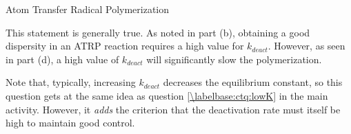 \begin{activity}{Atom Transfer Radical Polymerization}
\begin{exercises}
\begin{enumerate}
		\begin{solution}{}
			This statement is generally true.  As noted in part (b), obtaining a good dispersity in an ATRP reaction requires a high value for $k_{deact}$.  However, as seen in part (d), a high value of $k_{deact}$ will significantly slow the polymerization.
			
			Note that, typically, increasing $k_{deact}$ decreases the equilibrium constant, so this question gets at the same idea as question \ref{\labelbase:ctq:lowK} in the main activity.  However, it \emph{adds} the criterion that the deactivation rate must itself be high to maintain good control.
		\end{solution}
		
		\end{enumerate}
	
\end{exercises}


%
%	


	
\end{activity}